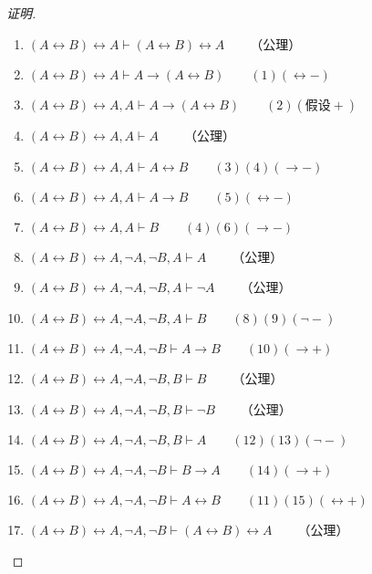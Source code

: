\documentclass{article}
\begin{document}
\begin{CJK*}{UTF8}{gbsn}
    \begin{proof}[证明]
      
      $\quad$

      \begin{enumerate}
        \item $(A\leftrightarrow B)\leftrightarrow A \vdash (A\leftrightarrow B)\leftrightarrow A\qquad$（公理）
        \item $(A\leftrightarrow B)\leftrightarrow A \vdash A\to (A\leftrightarrow B)\qquad(1)(\leftrightarrow -)$
        \item $(A\leftrightarrow B)\leftrightarrow A, A \vdash A\to (A\leftrightarrow B)\qquad(2)(\text{假设} +)$
        \item $(A\leftrightarrow B)\leftrightarrow A, A \vdash A\qquad $（公理）
        \item $(A\leftrightarrow B)\leftrightarrow A, A \vdash A\leftrightarrow B\qquad (3)(4)(\to -) $
        \item $(A\leftrightarrow B)\leftrightarrow A, A \vdash A\to B\qquad (5)(\leftrightarrow -)$
        \item $(A\leftrightarrow B)\leftrightarrow A, A \vdash B\qquad (4)(6)(\to -)$
        \item $(A\leftrightarrow B)\leftrightarrow A, \lnot A, \lnot B, A \vdash A\qquad $（公理）
        \item $(A\leftrightarrow B)\leftrightarrow A, \lnot A, \lnot B, A \vdash \lnot A\qquad $（公理）
        \item $(A\leftrightarrow B)\leftrightarrow A, \lnot A, \lnot B, A \vdash B\qquad (8)(9)(\lnot -)$
        \item $(A\leftrightarrow B)\leftrightarrow A, \lnot A, \lnot B \vdash A \to B\qquad (10)(\to +)$
        \item $(A\leftrightarrow B)\leftrightarrow A, \lnot A, \lnot B, B \vdash B\qquad $（公理）
        \item $(A\leftrightarrow B)\leftrightarrow A, \lnot A, \lnot B, B \vdash \lnot B\qquad $（公理）
        \item $(A\leftrightarrow B)\leftrightarrow A, \lnot A, \lnot B, B \vdash A\qquad (12)(13)(\lnot -)$
        \item $(A\leftrightarrow B)\leftrightarrow A, \lnot A, \lnot B \vdash B \to A\qquad (14)(\to +)$
        \item $(A\leftrightarrow B)\leftrightarrow A, \lnot A, \lnot B \vdash A \leftrightarrow B\qquad (11)(15)(\leftrightarrow +)$
        \item $(A\leftrightarrow B)\leftrightarrow A, \lnot A, \lnot B \vdash (A \leftrightarrow B)\leftrightarrow A\qquad $（公理）

\end{enumerate}
\end{proof}
\end{CJK*}
\end{document}
